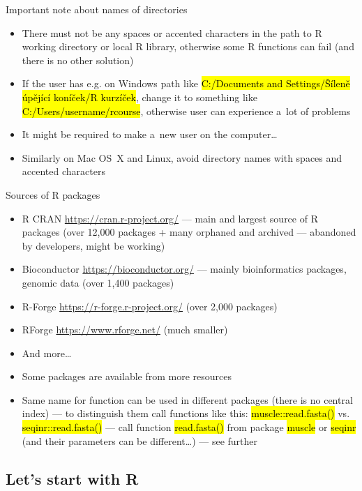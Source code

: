 \documentclass[compress, ucs, xelatex, 11pt, xcolor=svgnames,
  hyperref={
    bookmarks=true,
    unicode=true,
    colorlinks=true,
    pdftitle={Molecular data in R},
    plainpages=false,
    pdfauthor={Vojtech Zeisek},
    pdfsubject={Course about phylogeny and evolution in R},
    pdfcreator={XeLaTeX},
    pdfkeywords={R, evolution, phylogeny, molecular data},
    linkcolor=Tomato,
    anchorcolor=SaddleBrown,
    citecolor=Goldenrod,
    filecolor=DarkMagenta,
    menucolor=Sienna,
    urlcolor=DarkTurquoise,
    pdftex},
  url={hyphens, lowtilde} %
  ]{beamer}
\renewcommand{\texttt}[1]{\hl{\ttfamily #1}}
\begin{document}
\begin{frame}{Important note about names of directories}
  \begin{itemize}
    \item \alert{There must not be any spaces or accented characters in the path to R working directory or local R library}, otherwise some R functions can fail (and there is no other solution)
    \item If the user has e.g. on Windows path like \texttt{C:/Documents and Settings/Šíleně úpějící koníček/R kurzíček}, change it to something like \texttt{C:/Users/username/rcourse}, otherwise user can experience a~lot of problems
    \item It might be required to make a~new user on the computer\ldots
    \item Similarly on Mac OS~X and Linux, avoid directory names with spaces and accented characters
  \end{itemize}
\end{frame}

\begin{frame}{Sources of R packages}
  \label{sources}
  \begin{itemize}
    \item R CRAN \url{https://cran.r-project.org/} --- main and largest source of R packages (over 12,000 packages + many orphaned and archived --- abandoned by developers, might be working)
    \item Bioconductor \url{https://bioconductor.org/} --- mainly bioinformatics packages, genomic data (over 1,400 packages)
    \item R-Forge \url{https://r-forge.r-project.org/} (over 2,000 packages)
    \item RForge \url{https://www.rforge.net/} (much smaller)
    \item And more\ldots
    \item Some packages are available from more resources
    \item Same name for function can be used in different packages (there is no central index) --- to distinguish them call functions like this: \texttt{muscle::read.fasta()} vs. \texttt{seqinr::read.fasta()} --- call function \texttt{read.fasta()} from package \texttt{muscle} \alert{or} \texttt{seqinr} (and their parameters can be different\ldots) --- see further
  \end{itemize}
\end{frame}

\subsection{Let's start with R}
\end{document}
